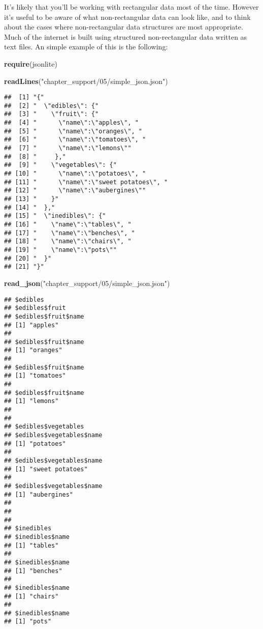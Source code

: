 \documentclass[]{book}
\newenvironment{Shaded}{\begin{snugshade}}{\end{snugshade}}
\newcommand{\KeywordTok}[1]{\textcolor[rgb]{0.13,0.29,0.53}{\textbf{#1}}}
\newcommand{\StringTok}[1]{\textcolor[rgb]{0.31,0.60,0.02}{#1}}
\newcommand{\NormalTok}[1]{#1}
\theoremstyle{definition}
\theoremstyle{definition}
\theoremstyle{definition}
\theoremstyle{remark}
\begin{document}
It's likely that you'll be working with rectangular data most of the
time. However it's useful to be aware of what non-rectangular data can
look like, and to think about the cases where non-rectangular data
structures are most appropriate. Much of the internet is built using
structured non-rectangular data written as text files. An simple example
of this is the following:

\begin{Shaded}
\begin{Highlighting}[]
\KeywordTok{require}\NormalTok{(jsonlite)}

\KeywordTok{readLines}\NormalTok{(}\StringTok{"chapter_support/05/simple_json.json"}\NormalTok{)}
\end{Highlighting}
\end{Shaded}

\begin{verbatim}
##  [1] "{"                                  
##  [2] "  \"edibles\": {"                   
##  [3] "    \"fruit\": {"                   
##  [4] "      \"name\":\"apples\", "        
##  [5] "      \"name\":\"oranges\", "       
##  [6] "      \"name\":\"tomatoes\", "      
##  [7] "      \"name\":\"lemons\""          
##  [8] "     },"                            
##  [9] "    \"vegetables\": {"              
## [10] "      \"name\":\"potatoes\", "      
## [11] "      \"name\":\"sweet potatoes\", "
## [12] "      \"name\":\"aubergines\""      
## [13] "    }"                              
## [14] "  },"                               
## [15] "  \"inedibles\": {"                 
## [16] "    \"name\":\"tables\", "          
## [17] "    \"name\":\"benches\", "         
## [18] "    \"name\":\"chairs\", "          
## [19] "    \"name\":\"pots\""              
## [20] "  }"                                
## [21] "}"
\end{verbatim}

\begin{Shaded}
\begin{Highlighting}[]
\KeywordTok{read_json}\NormalTok{(}\StringTok{"chapter_support/05/simple_json.json"}\NormalTok{)}
\end{Highlighting}
\end{Shaded}

\begin{verbatim}
## $edibles
## $edibles$fruit
## $edibles$fruit$name
## [1] "apples"
## 
## $edibles$fruit$name
## [1] "oranges"
## 
## $edibles$fruit$name
## [1] "tomatoes"
## 
## $edibles$fruit$name
## [1] "lemons"
## 
## 
## $edibles$vegetables
## $edibles$vegetables$name
## [1] "potatoes"
## 
## $edibles$vegetables$name
## [1] "sweet potatoes"
## 
## $edibles$vegetables$name
## [1] "aubergines"
## 
## 
## 
## $inedibles
## $inedibles$name
## [1] "tables"
## 
## $inedibles$name
## [1] "benches"
## 
## $inedibles$name
## [1] "chairs"
## 
## $inedibles$name
## [1] "pots"
\end{verbatim}
\end{document}
